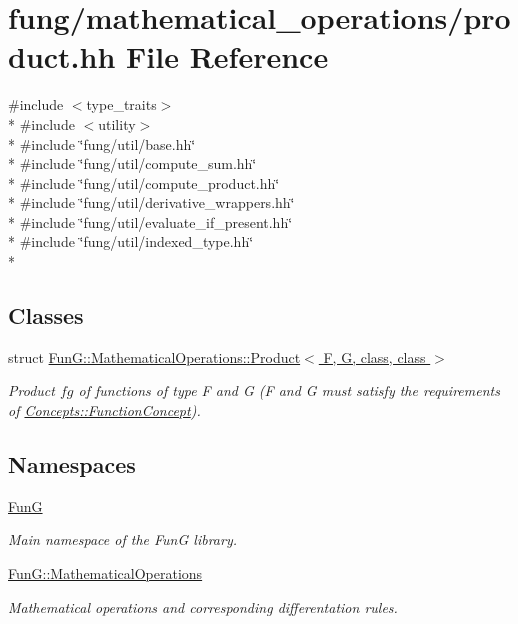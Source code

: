\hypertarget{product_8hh}{}\section{fung/mathematical\+\_\+operations/product.hh File Reference}
\label{product_8hh}
{\ttfamily \#include $<$type\+\_\+traits$>$}\\*
{\ttfamily \#include $<$utility$>$}\\*
{\ttfamily \#include \char`\"{}fung/util/base.\+hh\char`\"{}}\\*
{\ttfamily \#include \char`\"{}fung/util/compute\+\_\+sum.\+hh\char`\"{}}\\*
{\ttfamily \#include \char`\"{}fung/util/compute\+\_\+product.\+hh\char`\"{}}\\*
{\ttfamily \#include \char`\"{}fung/util/derivative\+\_\+wrappers.\+hh\char`\"{}}\\*
{\ttfamily \#include \char`\"{}fung/util/evaluate\+\_\+if\+\_\+present.\+hh\char`\"{}}\\*
{\ttfamily \#include \char`\"{}fung/util/indexed\+\_\+type.\+hh\char`\"{}}\\*
\subsection*{Classes}
\begin{DoxyCompactItemize}
\item 
struct \hyperlink{structFunG_1_1MathematicalOperations_1_1Product}{Fun\+G\+::\+Mathematical\+Operations\+::\+Product$<$ F, G, class, class $>$}
\begin{DoxyCompactList}\small\item\em Product $fg$ of functions of type F and G (F and G must satisfy the requirements of \hyperlink{structFunG_1_1Concepts_1_1FunctionConcept}{Concepts\+::\+Function\+Concept}). \end{DoxyCompactList}\end{DoxyCompactItemize}
\subsection*{Namespaces}
\begin{DoxyCompactItemize}
\item 
 \hyperlink{namespaceFunG}{Fun\+G}
\begin{DoxyCompactList}\small\item\em Main namespace of the Fun\+G library. \end{DoxyCompactList}\item 
 \hyperlink{namespaceFunG_1_1MathematicalOperations}{Fun\+G\+::\+Mathematical\+Operations}
\begin{DoxyCompactList}\small\item\em Mathematical operations and corresponding differentation rules. \end{DoxyCompactList}\end{DoxyCompactItemize}
